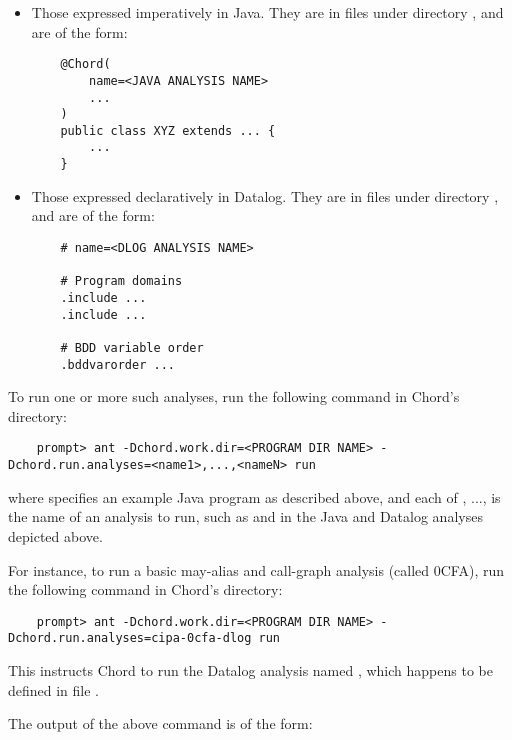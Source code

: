 \begin{itemize}
\item
Those expressed imperatively in Java. They are in  files under
directory , and are of the form:

\begin{verbatim}
    @Chord(
        name=<JAVA ANALYSIS NAME>
        ...
    )
    public class XYZ extends ... {
        ...
    }
\end{verbatim}

\item

Those expressed declaratively in Datalog.  They are in  files under
directory , and are of the form:

\begin{verbatim}
    # name=<DLOG ANALYSIS NAME>

    # Program domains
    .include ...
    .include ...

    # BDD variable order
    .bddvarorder ...
\end{verbatim}
\end{itemize}

To run one or more such analyses, run the following command in Chord's  directory:

\begin{verbatim}
    prompt> ant -Dchord.work.dir=<PROGRAM DIR NAME> -Dchord.run.analyses=<name1>,...,<nameN> run
\end{verbatim}

where  specifies an example Java program as described above,
and each of , ...,  is the name of an analysis to run,
such as  and  in the Java and
Datalog analyses depicted above.

For instance, to run a basic may-alias and call-graph analysis (called 0CFA),
run the following command in Chord's  directory:

\begin{verbatim}
    prompt> ant -Dchord.work.dir=<PROGRAM DIR NAME> -Dchord.run.analyses=cipa-0cfa-dlog run
\end{verbatim}

This instructs Chord to run the Datalog analysis named ,
which happens to be defined in file .

The output of the above command is of the form:

